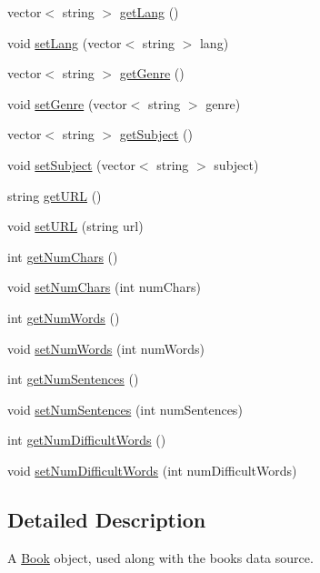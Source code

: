 \begin{DoxyCompactItemize}
vector$<$ string $>$ \hyperlink{classbridges_1_1_book_afe447c2884d59df17bed7ba2a4dc38a9}{get\+Lang} ()
\item 
void \hyperlink{classbridges_1_1_book_acec57a03086884a8ebae4c608c19e5cf}{set\+Lang} (vector$<$ string $>$ lang)
\item 
vector$<$ string $>$ \hyperlink{classbridges_1_1_book_ac3c2724781fdd331946a1c2eb7c3d9b7}{get\+Genre} ()
\item 
void \hyperlink{classbridges_1_1_book_a599852c24b9093e04fb124f21cb31419}{set\+Genre} (vector$<$ string $>$ genre)
\item 
vector$<$ string $>$ \hyperlink{classbridges_1_1_book_aea7da4cd608fbccf1742f64913a314c0}{get\+Subject} ()
\item 
void \hyperlink{classbridges_1_1_book_a9ee227f750be7ab000fb30cf361a8f5c}{set\+Subject} (vector$<$ string $>$ subject)
\item 
string \hyperlink{classbridges_1_1_book_ade9cece412cf86a8d2e7a29c308c276a}{get\+U\+RL} ()
\item 
void \hyperlink{classbridges_1_1_book_a4a96a6bd3956056b450c9df13e976a5a}{set\+U\+RL} (string url)
\item 
int \hyperlink{classbridges_1_1_book_ad84753469316165a26e33abfe7d61861}{get\+Num\+Chars} ()
\item 
void \hyperlink{classbridges_1_1_book_a31f85f174ab86e6f9eb2131c3dbe1cdf}{set\+Num\+Chars} (int num\+Chars)
\item 
int \hyperlink{classbridges_1_1_book_af3810d4dab23944d6cb83f6fb3a627d7}{get\+Num\+Words} ()
\item 
void \hyperlink{classbridges_1_1_book_acbed3f0ff253868d8747826a27ef30ac}{set\+Num\+Words} (int num\+Words)
\item 
int \hyperlink{classbridges_1_1_book_aef8e6b378e0d86124f79ea1283666333}{get\+Num\+Sentences} ()
\item 
void \hyperlink{classbridges_1_1_book_af16061c14c40b1672c7801a4c3a2d33b}{set\+Num\+Sentences} (int num\+Sentences)
\item 
int \hyperlink{classbridges_1_1_book_ae8e8b7b3b12e86ac7bb121aca1a14512}{get\+Num\+Difficult\+Words} ()
\item 
void \hyperlink{classbridges_1_1_book_adc7a54f2a494aeac02cadb3eb4caedbc}{set\+Num\+Difficult\+Words} (int num\+Difficult\+Words)
\end{DoxyCompactItemize}


\subsection{Detailed Description}
A \hyperlink{classbridges_1_1_book}{Book} object, used along with the books data source. 

